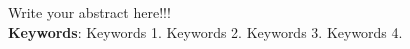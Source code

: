 
\begin{resumo}[ABSTRACT]
\begin{SingleSpacing}


Write your abstract here!!!\\

\textbf{Keywords}: Keywords 1. Keywords 2. Keywords 3. Keywords 4.

\end{SingleSpacing}
\end{resumo}

